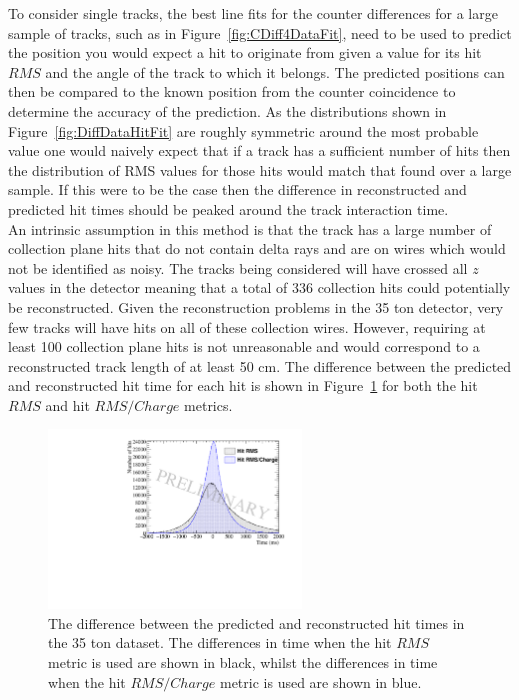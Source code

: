 To consider single tracks, the best line fits for the counter differences for a large sample of tracks, such as in Figure~\ref{fig:CDiff4DataFit}, need to be used to predict the position you would expect a hit to originate from given a value for its hit $RMS$ and the angle of the track to which it belongs. The predicted positions can then be compared to the known position from the counter coincidence to determine the accuracy of the prediction. As the distributions shown in Figure~\ref{fig:DiffDataHitFit} are roughly symmetric around the most probable value one would naively expect that if a track has a sufficient number of hits then the distribution of RMS values for those hits would match that found over a large sample. If this were to be the case then the difference in reconstructed and predicted hit times should be peaked around the track interaction time. \\

An intrinsic assumption in this method is that the track has a large number of collection plane hits that do not contain delta rays and are on wires which would not be identified as noisy. The tracks being considered will have crossed all $z$ values in the detector meaning that a total of 336 collection hits could potentially be reconstructed. Given the reconstruction problems in the 35 ton detector, very few tracks will have hits on all of these collection wires. However, requiring at least 100 collection plane hits is not unreasonable and would correspond to a reconstructed track length of at least 50 cm. The difference between the predicted and reconstructed hit time for each hit is shown in Figure~\ref{fig:DiffDataPredHit} for both the hit $RMS$ and hit $RMS/Charge$ metrics. \\

\begin{figure}[h!]
  \centering
  \includegraphics[width=0.6\textwidth]{DifferenceInteractionTime_Data}
  \caption[The difference between the predicted and reconstructed hit times in the 35 ton dataset]
          {The difference between the predicted and reconstructed hit times in the 35 ton dataset. The differences in time when the hit $RMS$ metric is used are shown in black, whilst the differences in time when the hit $RMS/Charge$ metric is used are shown in blue.}
  \label{fig:DiffDataPredHit}
\end{figure}

